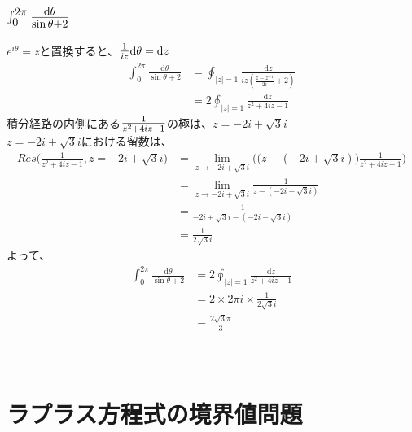 \documentclass[dvipdfmx,a4paper]{jsarticle}
\begin{document}
\subsection{$\mbox{\Large$\int_{0}^{2\pi}\frac{\mathrm{d}\theta}{\sin{\theta} + 2}$}$}
$e^{i\theta} = z$と置換すると、$\mbox{\large$\frac{1}{iz}$}\mathrm{d}\theta = \mathrm{d}z$
\begin{align*}
\int_{0}^{2\pi}\frac{\mathrm{d}\theta}{\sin{\theta} + 2} &= \oint_{|z| = 1}\frac{\mathrm{d}z}{iz(\frac{z - z^{-1}}{2i} + 2)}\\
&= 2\oint_{|z| = 1}\frac{\mathrm{d}z}{z^2 + 4iz - 1}
\end{align*}
積分経路の内側にある$\mbox{\large$\frac{1}{z^2 + 4iz - 1}$}$の極は、$z = -2i + \sqrt{3}i$\\
$z = -2i + \sqrt{3}i$における留数は、
\begin{align*}
Res\biggl(\frac{1}{z^2 + 4iz - 1}, z = -2i + \sqrt{3}i\biggr) &= \lim_{z\to -2i + \sqrt{3}i}\biggl(\bigl(z - (-2i + \sqrt{3}i)\bigr)\frac{1}{z^2 + 4iz - 1}\biggr)\\
&= \lim_{z\to -2i + \sqrt{3}i}\frac{1}{z - (-2i - \sqrt{3}i)}\\
&= \frac{1}{-2i + \sqrt{3}i - (-2i - \sqrt{3}i)}\\
&=\frac{1}{2\sqrt{3}i}
\end{align*}
よって、
\begin{align*}
\int_{0}^{2\pi}\frac{\mathrm{d}\theta}{\sin{\theta} + 2} &= 2\oint_{|z| = 1}\frac{\mathrm{d}z}{z^2 + 4iz - 1}\\
&= 2 \times 2\pi i \times \frac{1}{2\sqrt{3}i}\\
&= \frac{2\sqrt{3}\pi}{3}
\end{align*}
\\\\

\section{ラプラス方程式の境界値問題}
\end{document}
